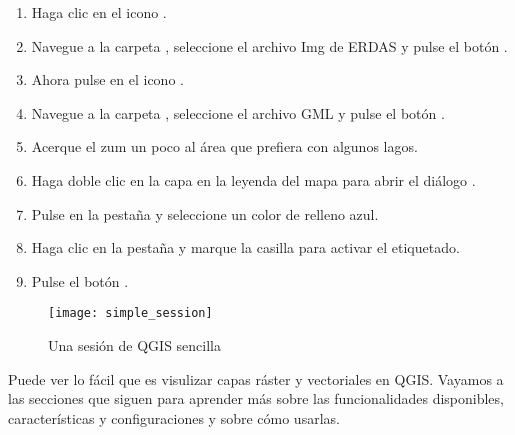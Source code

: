 
\begin{enumerate}
\item Haga clic en el icono .
\item Navegue a la carpeta , seleccione el
archivo Img de ERDAS  y pulse el botón .
\item Ahora pulse en el icono .
\item Navegue a la carpeta , seleccione
el archivo GML  y pulse el botón .
\item Acerque el zum un poco al área que prefiera con algunos lagos.
\item Haga doble clic en la capa  en la leyenda del mapa para abrir el 
diálogo .
\item Pulse en la pestaña  y seleccione un color de relleno azul.
\item Haga clic en la pestaña  y marque la casilla  
para activar el etiquetado.
\item Pulse el botón .
\end{enumerate} 

\begin{figure}[ht]
   \begin{center}
   \caption{Una sesión de QGIS sencilla \nixcaption}\label{fig:simple_session}\smallskip
   \texttt{[image: simple\_session]}
\end{center}  
\end{figure}

Puede ver lo fácil que es visulizar capas ráster y vectoriales en 
QGIS. Vayamos a las secciones que siguen para aprender más sobre las 
funcionalidades disponibles, características y configuraciones y sobre cómo usarlas.
